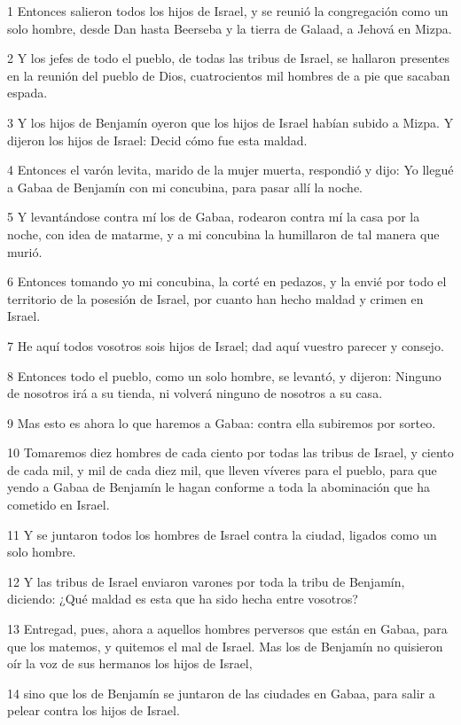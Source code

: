 \par 1 Entonces salieron todos los hijos de Israel, y se reunió la congregación como un solo hombre, desde Dan hasta Beerseba y la tierra de Galaad, a Jehová en Mizpa.
\par 2 Y los jefes de todo el pueblo, de todas las tribus de Israel, se hallaron presentes en la reunión del pueblo de Dios, cuatrocientos mil hombres de a pie que sacaban espada.
\par 3 Y los hijos de Benjamín oyeron que los hijos de Israel habían subido a Mizpa. Y dijeron los hijos de Israel: Decid cómo fue esta maldad.
\par 4 Entonces el varón levita, marido de la mujer muerta, respondió y dijo: Yo llegué a Gabaa de Benjamín con mi concubina, para pasar allí la noche.
\par 5 Y levantándose contra mí los de Gabaa, rodearon contra mí la casa por la noche, con idea de matarme, y a mi concubina la humillaron de tal manera que murió.
\par 6 Entonces tomando yo mi concubina, la corté en pedazos, y la envié por todo el territorio de la posesión de Israel, por cuanto han hecho maldad y crimen en Israel.
\par 7 He aquí todos vosotros sois hijos de Israel; dad aquí vuestro parecer y consejo.
\par 8 Entonces todo el pueblo, como un solo hombre, se levantó, y dijeron: Ninguno de nosotros irá a su tienda, ni volverá ninguno de nosotros a su casa.
\par 9 Mas esto es ahora lo que haremos a Gabaa: contra ella subiremos por sorteo.
\par 10 Tomaremos diez hombres de cada ciento por todas las tribus de Israel, y ciento de cada mil, y mil de cada diez mil, que lleven víveres para el pueblo, para que yendo a Gabaa de Benjamín le hagan conforme a toda la abominación que ha cometido en Israel.
\par 11 Y se juntaron todos los hombres de Israel contra la ciudad, ligados como un solo hombre.
\par 12 Y las tribus de Israel enviaron varones por toda la tribu de Benjamín, diciendo: ¿Qué maldad es esta que ha sido hecha entre vosotros?
\par 13 Entregad, pues, ahora a aquellos hombres perversos que están en Gabaa, para que los matemos, y quitemos el mal de Israel. Mas los de Benjamín no quisieron oír la voz de sus hermanos los hijos de Israel,
\par 14 sino que los de Benjamín se juntaron de las ciudades en Gabaa, para salir a pelear contra los hijos de Israel.
